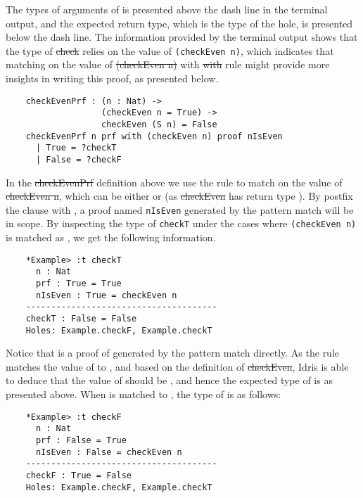 The types of arguments of  is presented above the dash line in the terminal output, and the expected return type, which is the type of the  hole, is presented below the dash line. The information provided by the terminal output shows that the type of \st{check} relies on the value of \texttt{(checkEven n)}, which indicates that matching on the value of \st{(checkEven n)} with \st{with} rule might provide more insights in writing this proof, as presented below. 
\begin{lstlisting}
    checkEvenPrf : (n : Nat) -> 
                   (checkEven n = True) -> 
                   checkEven (S n) = False
    checkEvenPrf n prf with (checkEven n) proof nIsEven
      | True = ?checkT
      | False = ?checkF
\end{lstlisting}

In the \st{checkEvenPrf} definition above we use the  rule to match on the value of \st{checkEven n}, which can be either  or  (as \st{checkEven} has return type ). By postfix the  clause with , a proof named \texttt{nIsEven} generated by the pattern match will be in scope. By inspecting the type of \texttt{checkT} under the cases where \texttt{(checkEven n)} is matched as , we get the following information. 
\begin{lstlisting}
    *Example> :t checkT
      n : Nat
      prf : True = True
      nIsEven : True = checkEven n
    --------------------------------------
    checkT : False = False
    Holes: Example.checkF, Example.checkT
\end{lstlisting}

Notice that  is a proof of  generated by the pattern match directly. As the  rule matches the value of  to , and based on the definition of \st{checkEven}, Idris is able to deduce that the value of  should be , and hence the expected type of  is  as presented above. When  is matched to , the type of  is as follows: 
\begin{lstlisting}
    *Example> :t checkF
      n : Nat
      prf : False = True
      nIsEven : False = checkEven n
    --------------------------------------
    checkF : True = False
    Holes: Example.checkF, Example.checkT
\end{lstlisting}

